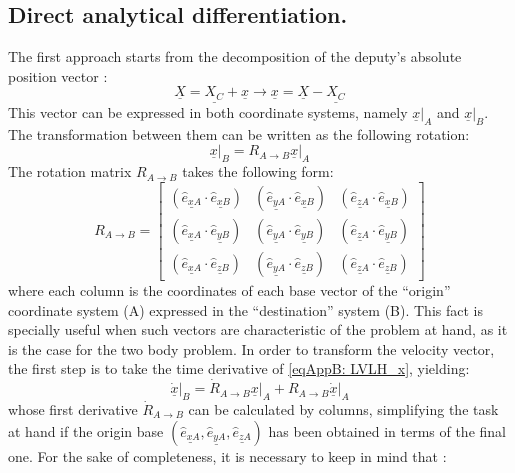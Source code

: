	\subsection{Direct analytical differentiation.} \label{sec:	LVLH_theory}
	\indent The first approach starts from the decomposition of the deputy's absolute position vector \cite{LVLH}:
	\[
	\underline{X} = \underline{X_C} + \underline{x} \rightarrow \underline{x} = \underline{X} - \underline{X_C}
	\]
	\indent This vector can be expressed in both coordinate systems, namely $\underline{x}\rvert_A$ and $\underline{x}\rvert_B$. The transformation between them can be written as the following rotation:
	\begin{equation}
	\underline{x}\rvert_{B} = R_{A \to B} \underline{x}\rvert_{A}
	\label{eqAppB: 	LVLH_x}
	\end{equation}
	\indent The rotation matrix $R_{A \to B}$ takes the following form:
	\[
	R_{A \to B} = 
	\left[ \begin{array}{ccc}
	\left(\underline{\hat{e}_{xA}} \cdot \underline{\hat{e}_{xB}}\right) & \left(\underline{\hat{e}_{yA}} \cdot \underline{\hat{e}_{xB}}\right) & \left(\underline{\hat{e}_{zA}} \cdot \underline{\hat{e}_{xB}}\right) \\
	\left(\underline{\hat{e}_{xA}} \cdot \underline{\hat{e}_{yB}}\right) & \left(\underline{\hat{e}_{yA}} \cdot \underline{\hat{e}_{yB}}\right) & \left(\underline{\hat{e}_{zA}} \cdot \underline{\hat{e}_{yB}}\right) \\
	\left(\underline{\hat{e}_{xA}} \cdot \underline{\hat{e}_{zB}}\right) & \left(\underline{\hat{e}_{yA}} \cdot \underline{\hat{e}_{zB}}\right) & \left(\underline{\hat{e}_{zA}} \cdot \underline{\hat{e}_{zB}}\right)
	\end{array}\right]
	\]
	\noindent where each column is the coordinates of each base vector of the ``origin'' coordinate system (A) expressed in the ``destination'' system (B). This fact is specially useful when such vectors are characteristic of the problem at hand, as it is the case for the two body problem. In order to transform the velocity vector, the first step is to take the time derivative of \ref{eqAppB: 	LVLH_x}, yielding:
	\begin{equation}
	\underline{\dot{x}}\rvert_{B} = \dot{R}_{A \to B} \underline{x}\rvert_{A} + R_{A \to B} \underline{\dot{x}}\rvert_{A}
	\label{eqAppB: 	LVLH_xdot}
	\end{equation}
	\noindent whose first derivative $\dot{R}_{A \to B}$ can be calculated by columns, simplifying the task at hand if the origin base $\left( \underline{\hat{e}_{xA}}, \underline{\hat{e}_{yA}}, \underline{\hat{e}_{zA}}\right)$ has been obtained in terms of the final one. For the sake of completeness, it is necessary to keep in mind that \cite{LVLH}:
